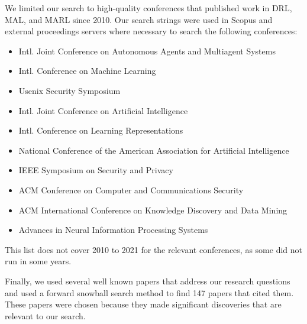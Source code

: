 \documentclass[conference,compsoc]{IEEEtran}
\begin{document}
We limited our search to high-quality conferences that published work in DRL, MAL, and MARL since 2010. Our search strings were used in Scopus and external proceedings servers where necessary to search the following conferences:
\begin{itemize}
    \item Intl. Joint Conference on Autonomous Agents and Multiagent Systems 
    \item Intl. Conference on Machine Learning 
    \item Usenix Security Symposium 
    \item Intl. Joint Conference on Artificial Intelligence 
    \item Intl. Conference on Learning Representations 
    \item National Conference of the American Association for Artificial Intelligence 
    \item IEEE Symposium on Security and Privacy 
    \item ACM Conference on Computer and Communications Security 
    \item ACM International Conference on Knowledge Discovery and Data Mining
    \item Advances in Neural Information Processing Systems
\end{itemize}
This list does not cover 2010 to 2021 for the relevant conferences, as some  did not run in some years.

Finally, we used several well known papers that address our research questions \cite{tu_adversarial_2021,sun_stealthy_2020,blumenkamp_emergence_2021} and used a forward snowball search method \cite{wohlin_guidelines_2014} to find 147 papers that cited them. These papers were chosen because they made significant discoveries that are relevant to our search. 
\end{document}
